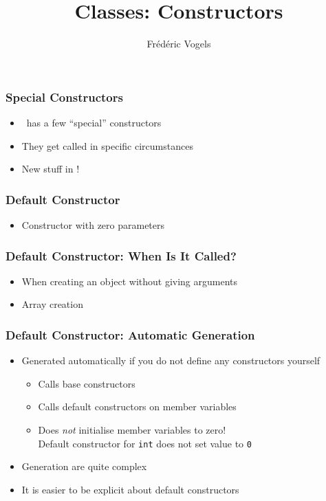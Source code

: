 \documentclass{../ucll-slides}
\title{Classes: Constructors}
\author{Fr\'ed\'eric Vogels}
\begin{document}
\begin{frame}
  \titlepage
\end{frame}

\begin{frame}
  \frametitle{Special Constructors}
  \begin{itemize}
    \item \cpp\ has a few ``special'' constructors
    \item They get called in specific circumstances
    \item New stuff in !
  \end{itemize}
\end{frame}

\begin{frame}
  \frametitle{Default Constructor}
  \begin{itemize}
    \item Constructor with zero parameters
  \end{itemize}
\end{frame}

\begin{frame}
  \frametitle{Default Constructor: When Is It Called?}
  \begin{itemize}
    \item When creating an object without giving arguments
    \item Array creation
  \end{itemize}
  \vskip5mm
\end{frame}

\begin{frame}
  \frametitle{Default Constructor: Automatic Generation}
  \begin{itemize}
    \item Generated automatically if you do not define any constructors yourself
          \begin{itemize}
            \item Calls base constructors
            \item Calls default constructors on member variables
            \item Does \emph{not} initialise member variables to zero! \\ Default constructor for {\tt int} does not set value to {\tt 0}
          \end{itemize}
    \item Generation  are quite complex
    \item It is easier to be explicit about default constructors
  \end{itemize}
\end{frame}
\end{document}
